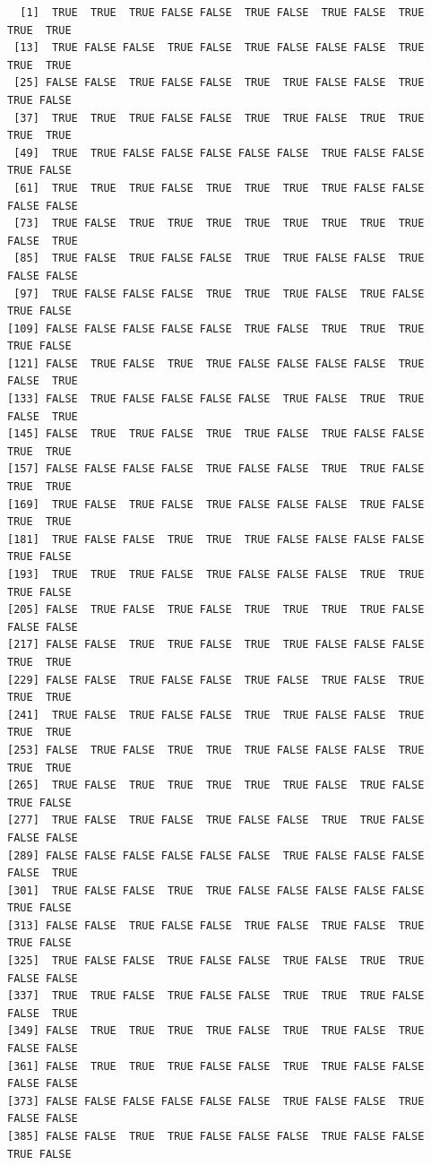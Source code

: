\documentclass[
  letterpaper,
  DIV=11,
  numbers=noendperiod]{scrreprt}
\begin{document}
\begin{verbatim}
  [1]  TRUE  TRUE  TRUE FALSE FALSE  TRUE FALSE  TRUE FALSE  TRUE  TRUE  TRUE
 [13]  TRUE FALSE FALSE  TRUE FALSE  TRUE FALSE FALSE FALSE  TRUE  TRUE  TRUE
 [25] FALSE FALSE  TRUE FALSE FALSE  TRUE  TRUE FALSE FALSE  TRUE  TRUE FALSE
 [37]  TRUE  TRUE  TRUE FALSE FALSE  TRUE  TRUE FALSE  TRUE  TRUE  TRUE  TRUE
 [49]  TRUE  TRUE FALSE FALSE FALSE FALSE FALSE  TRUE FALSE FALSE  TRUE FALSE
 [61]  TRUE  TRUE  TRUE FALSE  TRUE  TRUE  TRUE  TRUE FALSE FALSE FALSE FALSE
 [73]  TRUE FALSE  TRUE  TRUE  TRUE  TRUE  TRUE  TRUE  TRUE  TRUE FALSE  TRUE
 [85]  TRUE FALSE  TRUE FALSE FALSE  TRUE  TRUE FALSE FALSE  TRUE FALSE FALSE
 [97]  TRUE FALSE FALSE FALSE  TRUE  TRUE  TRUE FALSE  TRUE FALSE  TRUE FALSE
[109] FALSE FALSE FALSE FALSE FALSE  TRUE FALSE  TRUE  TRUE  TRUE  TRUE FALSE
[121] FALSE  TRUE FALSE  TRUE  TRUE FALSE FALSE FALSE FALSE  TRUE FALSE  TRUE
[133] FALSE  TRUE FALSE FALSE FALSE FALSE  TRUE FALSE  TRUE  TRUE FALSE  TRUE
[145] FALSE  TRUE  TRUE FALSE  TRUE  TRUE FALSE  TRUE FALSE FALSE  TRUE  TRUE
[157] FALSE FALSE FALSE FALSE  TRUE FALSE FALSE  TRUE  TRUE FALSE  TRUE  TRUE
[169]  TRUE FALSE  TRUE FALSE  TRUE FALSE FALSE FALSE  TRUE FALSE  TRUE  TRUE
[181]  TRUE FALSE FALSE  TRUE  TRUE  TRUE FALSE FALSE FALSE FALSE  TRUE FALSE
[193]  TRUE  TRUE  TRUE FALSE  TRUE FALSE FALSE FALSE  TRUE  TRUE  TRUE FALSE
[205] FALSE  TRUE FALSE  TRUE FALSE  TRUE  TRUE  TRUE  TRUE FALSE FALSE FALSE
[217] FALSE FALSE  TRUE  TRUE FALSE  TRUE  TRUE FALSE FALSE FALSE  TRUE  TRUE
[229] FALSE FALSE  TRUE FALSE FALSE  TRUE FALSE  TRUE FALSE  TRUE  TRUE  TRUE
[241]  TRUE FALSE  TRUE FALSE FALSE  TRUE  TRUE FALSE FALSE  TRUE  TRUE  TRUE
[253] FALSE  TRUE FALSE  TRUE  TRUE  TRUE FALSE FALSE FALSE  TRUE  TRUE  TRUE
[265]  TRUE FALSE  TRUE  TRUE  TRUE  TRUE  TRUE FALSE  TRUE FALSE  TRUE FALSE
[277]  TRUE FALSE  TRUE FALSE  TRUE FALSE FALSE  TRUE  TRUE FALSE FALSE FALSE
[289] FALSE FALSE FALSE FALSE FALSE FALSE  TRUE FALSE FALSE FALSE FALSE  TRUE
[301]  TRUE FALSE FALSE  TRUE  TRUE FALSE FALSE FALSE FALSE FALSE  TRUE FALSE
[313] FALSE FALSE  TRUE FALSE FALSE  TRUE FALSE  TRUE FALSE  TRUE  TRUE FALSE
[325]  TRUE FALSE FALSE  TRUE FALSE FALSE  TRUE FALSE  TRUE  TRUE FALSE FALSE
[337]  TRUE  TRUE FALSE  TRUE FALSE FALSE  TRUE  TRUE  TRUE FALSE FALSE  TRUE
[349] FALSE  TRUE  TRUE  TRUE  TRUE FALSE  TRUE  TRUE FALSE  TRUE FALSE FALSE
[361] FALSE  TRUE  TRUE  TRUE FALSE FALSE  TRUE  TRUE FALSE FALSE FALSE FALSE
[373] FALSE FALSE FALSE FALSE FALSE FALSE  TRUE FALSE FALSE  TRUE FALSE FALSE
[385] FALSE FALSE  TRUE  TRUE FALSE FALSE FALSE  TRUE FALSE FALSE  TRUE FALSE

\end{verbatim}
\end{document}
